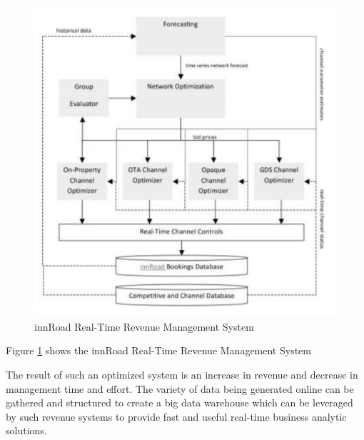 \documentclass[sigconf]{acmart}
\begin{document}
\begin{figure}
	\includegraphics[width=\columnwidth]{images/innRoad.pdf}
	\caption{innRoad Real-Time Revenue Management System \cite {bigdatarevenue09}}
        \label{F:Figure 3}
\end{figure}
Figure \ref{F:Figure 3} shows the innRoad Real-Time Revenue Management System

The result of such an optimized system is an increase in revenue and decrease in management time and effort. The variety of data being generated online can be gathered and structured to create a big data warehouse which can be leveraged by such revenue systems to provide fast and useful real-time business analytic solutions.
\end{document}

